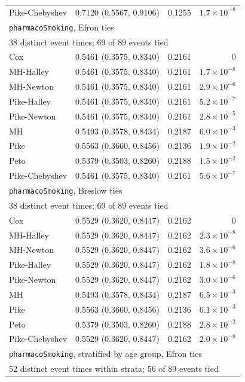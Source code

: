 \begin{longtable}{llrr}
Pike-Chebyshev & 0.7120 (0.5567, 0.9106) & 0.1255 & $1.7 \times 10^{-8}$ \\
\multicolumn{4}{l}{\texttt{pharmacoSmoking}, Efron ties} \\
\multicolumn{4}{l}{38 distinct event times; 69 of 89 events tied} \\
Cox & 0.5461 (0.3575, 0.8340) & 0.2161 & $0$ \\
MH-Halley & 0.5461 (0.3575, 0.8340) & 0.2161 & $1.7 \times 10^{-8}$ \\
MH-Newton & 0.5461 (0.3575, 0.8340) & 0.2161 & $2.9 \times 10^{-6}$ \\
Pike-Halley & 0.5461 (0.3575, 0.8340) & 0.2161 & $5.2 \times 10^{-7}$ \\
Pike-Newton & 0.5461 (0.3575, 0.8340) & 0.2161 & $2.8 \times 10^{-5}$ \\
MH & 0.5493 (0.3578, 0.8434) & 0.2187 & $6.0 \times 10^{-3}$ \\
Pike & 0.5563 (0.3660, 0.8456) & 0.2136 & $1.9 \times 10^{-2}$ \\
Peto & 0.5379 (0.3503, 0.8260) & 0.2188 & $1.5 \times 10^{-2}$ \\
Pike-Chebyshev & 0.5461 (0.3575, 0.8340) & 0.2161 & $5.6 \times 10^{-7}$ \\
\multicolumn{4}{l}{\texttt{pharmacoSmoking}, Breslow ties} \\
\multicolumn{4}{l}{38 distinct event times; 69 of 89 events tied} \\
Cox & 0.5529 (0.3620, 0.8447) & 0.2162 & $0$ \\
MH-Halley & 0.5529 (0.3620, 0.8447) & 0.2162 & $2.3 \times 10^{-8}$ \\
MH-Newton & 0.5529 (0.3620, 0.8447) & 0.2162 & $3.6 \times 10^{-6}$ \\
Pike-Halley & 0.5529 (0.3620, 0.8447) & 0.2162 & $1.8 \times 10^{-8}$ \\
Pike-Newton & 0.5529 (0.3620, 0.8447) & 0.2162 & $3.0 \times 10^{-6}$ \\
MH & 0.5493 (0.3578, 0.8434) & 0.2187 & $6.5 \times 10^{-3}$ \\
Pike & 0.5563 (0.3660, 0.8456) & 0.2136 & $6.1 \times 10^{-3}$ \\
Peto & 0.5379 (0.3503, 0.8260) & 0.2188 & $2.8 \times 10^{-2}$ \\
Pike-Chebyshev & 0.5529 (0.3620, 0.8447) & 0.2162 & $2.0 \times 10^{-8}$ \\
\multicolumn{4}{l}{\texttt{pharmacoSmoking}, stratified by age group, Efron ties} \\
\multicolumn{4}{l}{52 distinct event times within strata; 56 of 89 events tied} \\

\end{longtable}
